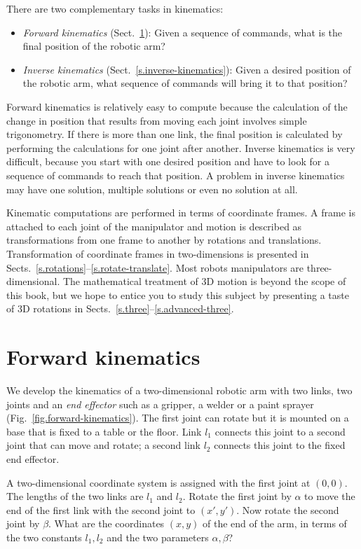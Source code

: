 There are two complementary tasks in kinematics:
\begin{itemize}
\item \textit{Forward kinematics} (Sect.~\ref{s.forward-kinematics}): Given a sequence of commands, what is the final position of the robotic arm?
\item \textit{Inverse kinematics}  (Sect.~\ref{s.inverse-kinematics}): Given a desired position of the robotic arm, what sequence of commands will bring it to that position?
\end{itemize}

Forward kinematics is relatively easy to compute because the calculation of the change in position that results from moving each joint involves simple trigonometry. If there is more than one link, the final position is calculated by performing the calculations for one joint after another. Inverse kinematics is very difficult, because you start with one desired position and have to look for a sequence of commands to reach that position. A problem in inverse kinematics may have one solution, multiple solutions or even no solution at all.

Kinematic computations are performed in terms of coordinate frames. A frame is attached to each joint of the manipulator and motion is described as transformations from one frame to another by rotations and translations. Transformation of coordinate frames in two-dimensions is presented in Sects.~\ref{s.rotations}--\ref{s.rotate-translate}. Most robots manipulators are three-dimensional. The mathematical treatment of 3D motion is beyond the scope of this book, but we hope to entice you to study this subject by presenting a taste of 3D rotations in Sects.~\ref{s.three}--\ref{s.advanced-three}.


\section{Forward kinematics}\label{s.forward-kinematics}

We develop the kinematics of a two-dimensional robotic arm with two links, two joints and an \emph{end effector} such as a gripper, a welder or a paint sprayer (Fig.~\ref{fig.forward-kinematics}). The first joint can rotate but it is mounted on a base that is fixed to a table or the floor. Link $l_1$ connects this joint to a second joint that can move and rotate; a second link $l_2$ connects this joint to the fixed end effector.

A two-dimensional coordinate system is assigned with the first joint at $(0,0)$. The lengths of the two links are $l_1$ and $l_2$. Rotate the first joint by $\alpha$ to move the end of the first link with the second joint to $(x',y')$. Now rotate the second joint by $\beta$. What are the coordinates $(x,y)$ of the end of the arm, in terms of the two constants $l_1,l_2$ and the two parameters $\alpha,\beta$?

